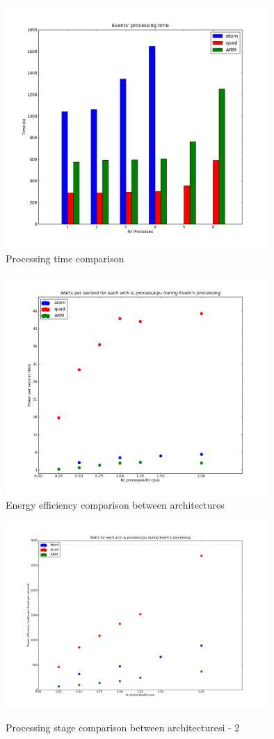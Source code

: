 \begin{figure}[h!]
  \centering
    \includegraphics[width=100mm]{"img/aalto/aalto_all_time"}
    \caption{Processing time comparison}
    \label{fig:aalto_time}
\end{figure}

\begin{figure}[h!]
  \centering
    \includegraphics[width=100mm]{"img/aalto/aalto_all"}
    \caption{Energy efficiency comparison between architectures}
    \label{fig:aalto_efficiency_comparison}
\end{figure}



\begin{figure}[h!]
  \centering
    \includegraphics[width=100mm]{"img/aalto/aalto_all2"}
    \label{fig:nf_ss}
    \caption{Processing stage comparison between architecturesi - 2}
\end{figure}


